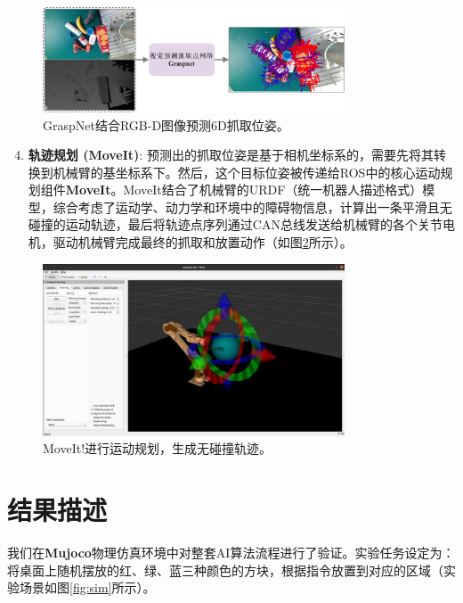 \documentclass{article}
\begin{document}
\begin{CJK*}{UTF8}{gbsn}
\begin{figure}[h!]
    \centering
    \includegraphics[width=0.8\textwidth]{image/report/1749437564396.png}
    \caption{GraspNet结合RGB-D图像预测6D抓取位姿。}
    \label{fig:graspnet}
\end{figure}

\begin{enumerate}
    \setcounter{enumi}{3}
    \item  \textbf{轨迹规划 (MoveIt)}: 预测出的抓取位姿是基于相机坐标系的，需要先将其转换到机械臂的基坐标系下。然后，这个目标位姿被传递给ROS中的核心运动规划组件\textbf{MoveIt}。MoveIt结合了机械臂的URDF（统一机器人描述格式）模型，综合考虑了运动学、动力学和环境中的障碍物信息，计算出一条平滑且无碰撞的运动轨迹，最后将轨迹点序列通过CAN总线发送给机械臂的各个关节电机，驱动机械臂完成最终的抓取和放置动作（如图\ref{fig:moveit}所示）。
\end{enumerate}

\begin{figure}[h!]
    \centering
    \includegraphics[width=0.8\textwidth]{image/report/1749437570789.png}
    \caption{MoveIt!进行运动规划，生成无碰撞轨迹。}
    \label{fig:moveit}
\end{figure}

\section{结果描述}

我们在\textbf{Mujoco}物理仿真环境中对整套AI算法流程进行了验证。实验任务设定为：将桌面上随机摆放的红、绿、蓝三种颜色的方块，根据指令放置到对应的区域（实验场景如图\ref{fig:sim}所示）。


\end{CJK*}
\end{document}
